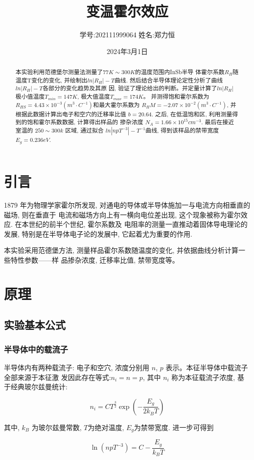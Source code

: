 \documentclass[12pt,a4paper]{article}
\title{\vspace{-4cm}\Large 变温霍尔效应}  %
\author{\kaishu 学号:202111999064 \hspace{2cm} 姓名:郑力恒}   %
\date{2024年3月1日}
\newcommand{\be}[1]{
    \begin{equation}
        #1
    \end{equation}
}
\begin{document}
\maketitle

\begin{abstract}
    本实验利用范德堡尔测量法测量了$77K\sim 300K$的温度范围内InSb半导
体霍尔系数$R_H$随温度T变化的变化, 并绘制出$ln|R_H|-T$曲线.
然后结合半导体理论定性分析了曲线$ln|R_H|-T$各部分的变化趋势及其原
因, 验证了理论给出的判断。并定量计算了$ln|R_H|$极小值温度$T_{min} = 147K$,
极大值温度$ T_{max} =174K $。
并测得饱和霍尔系数为 $R_{HS} = 4.43 \times 10^{-3} (m^3· C^{-1})$和最大霍尔系数为
$R_HM = -2.07 \times 10^{-2} (m^3· C^{-1})$, 并根据此数据计算出电子和空穴的迁移率比值
$b = 20.64$.
之后, 在低温饱和区, 利用测量得到的饱和霍尔系数数据, 计算得出样品的
掺杂浓度 $N_A = 1.66 \times 10^{15}cm^{-3}$.
最后在接近室温的 $250 \sim 300k$ 区域, 通过拟合 $ln|npT^{-3}| - T^{-1}$曲线, 得到该样品的禁带宽度$E_g = 0.236eV$.
\end{abstract}

\section{引言}
1879 年为物理学家霍尔所发现, 对通电的导体或半导体施加一与电流方向相垂直的磁场, 则在垂直于
电流和磁场方向上有一横向电位差出现, 这个现象被称为霍尔效应. 在本世纪的前半个世纪, 霍尔系数及
电阻率的测量一直推动着固体导电理论的发展, 特别是在半导体电子论的发展中, 它起着尤为重要的作用.

本实验采用范德堡方法, 测量样品霍尔系数随温度的变化, 并依据曲线分析计算一些特性参数——样
品掺杂浓度, 迁移率比值, 禁带宽度等。

\section{原理}
\subsection{实验基本公式}
\subsubsection{半导体中的载流子}
半导体内有两种载流子: 电子和空穴, 浓度分别用 $n$, $p$ 表示。本征半导体中载流子全部来源于本征激
发因此存在等式:$n_i = n = p$, 其中 $n_i$ 称为本征载流子浓度, 基于经典玻尔兹曼统计:
\be{n_{i}=C T^{\frac{3}{2}} \exp \left(-\frac{E_{g}}{2 k_{B} T}\right)}
其中, $k_B$ 为玻尔兹曼常数, $T$为绝对温度, $E_g$为禁带宽度. 进一步可得到
\be{\ln \left(n p T^{-3}\right)=C-\frac{E_{g}}{k_{B} T}}
\end{document}
